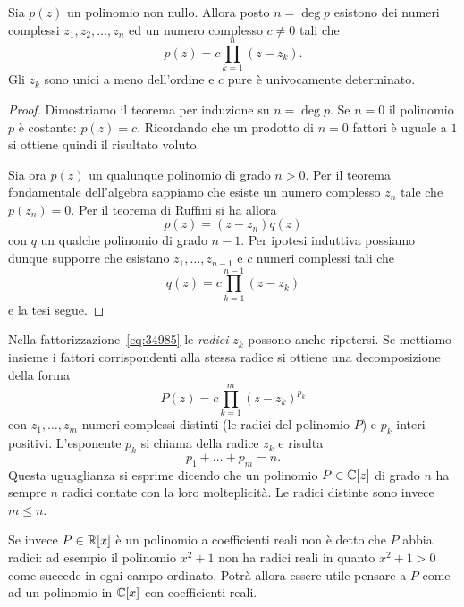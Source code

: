 \begin{theorem}
%
%
%
Sia $p(z)$ un polinomio non nullo. Allora posto $n=\deg p$ esistono dei numeri complessi $z_1, z_2, \dots, z_n$ ed un numero complesso $c\neq 0$ tali che
\begin{equation}\label{eq:34985}
  p(z) = c \prod_{k=1}^n (z-z_k).
\end{equation}
Gli $z_k$ sono unici a meno dell'ordine e $c$ pure è univocamente determinato.
\end{theorem}
%
\begin{proof}
Dimostriamo il teorema per induzione su $n=\deg p$. Se $n=0$ il polinomio $p$ è costante: $p(z) = c$. Ricordando che un prodotto di $n=0$ fattori è uguale a $1$ si ottiene quindi il risultato voluto.

Sia ora $p(z)$ un qualunque polinomio di grado $n>0$. Per il teorema fondamentale dell'algebra sappiamo che esiste un numero complesso $z_n$ tale che $p(z_n)=0$. Per il teorema di Ruffini si ha allora
\[
  p(z) = (z-z_n) q(z)
\]
con $q$ un qualche polinomio di grado $n-1$. Per ipotesi induttiva possiamo dunque supporre che esistano $z_1, \dots, z_{n-1}$ e $c$ numeri complessi tali che
\[
   q(z) = c \prod_{k=1}^{n-1} (z-z_k)
\]
e la tesi segue.
\end{proof}

Nella fattorizzazione~\eqref{eq:34985} le \emph{radici} $z_k$ possono
anche ripetersi. Se mettiamo insieme i fattori corrispondenti alla stessa radice
si ottiene una decomposizione della forma
\begin{equation}\label{eq:358925}
P(z) = c \prod_{k=1}^m (z-z_k)^{p_k}
\end{equation}
con $z_1, \dots, z_m$ numeri complessi distinti (le radici del polinomio $P$)
e $p_k$ interi positivi.
L'esponente $p_k$ si chiama
 della radice $z_k$ e risulta
\[
  p_1 + \dots + p_m = n.
\]
Questa uguaglianza si esprime dicendo che un polinomio $P\in {\mathbb C}[z]$
di grado $n$ ha sempre $n$ radici contate con la loro molteplicità.
Le radici distinte sono invece $m\le n$.

Se invece $P\in {\mathbb R}[x]$ è un polinomio a coefficienti reali
non è detto che $P$ abbia radici: ad esempio il
polinomio $x^2+1$ non ha radici reali in quanto $x^2+1>0$
come succede in ogni campo ordinato.
Potrà allora essere utile pensare a $P$ come ad un polinomio
in ${\mathbb C}[x]$ con coefficienti reali.

